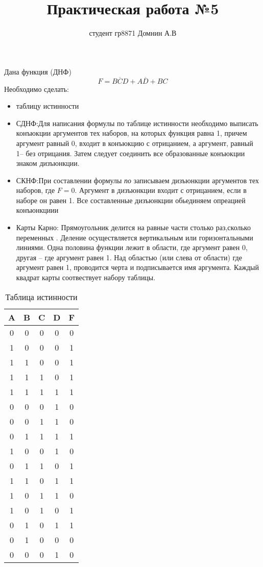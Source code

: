 \documentclass{article}
\title{Практическая работа №5}
\author{студент гр8871 Домнин А.В }
\begin{document}
\maketitle
\newcommand{\D}{10}
\newcommand{\I}{0.6}
\newcommand{\B}{0.2}
Дана функция (ДНФ)
$$
F=B\overline{C}D+A\overline{D}+BC
$$
Необходимо сделать:
\begin{itemize}
    \item таблицу истинности
    \item СДНФ:Для написания формулы по таблице истинности необходимо выписать конъюкции аргументов тех наборов, на которых функция равна 1, причем аргумент равный 0, входит в конъюкцию с отрицанием, а аргумент, равный 1-- без отрицания. Затем следует соединить все образованные конъюкции знаком дизъюнкции.
    \item СКНФ:При составлении формулы {\it по} записываем дизъюнкции аргументов тех наборов, где $F=0$. Аргумент в дизъюнкции входит с отрицанием, если в наборе он равен 1. Все составленные дизъюнкции обьединяем опреацией конъюнкциии
    \item Карты Карно: Прямоугольник делится на равные части столько раз,сколько переменных . Деление осуществляется вертикальным или горизонтальными линиями. Одна половина функции лежит в области, где аргумент равен 0, другая -- где аргумент равен 1. Над областью (или слева от области) где аргумент равен 1, проводится черта и подписывается имя аргумента. Каждый квадрат карты соотвествует набору таблицы.
\end{itemize}



\begin{table}[ht]
\centering
\begin{tabular}{|c|c|c|c|c|} \hline
A & B & C & D & F \\
\hline
0 & 0 & 0 & 0 & 0 \\%
\hline
1 & 0 & 0 & 0 & 1 \\%
\hline
1 & 1 & 0 & 0 & 1 \\%
\hline
1 & 1 & 1 & 0 & 1 \\%
\hline
1 & 1 & 1 & 1 & 1 \\%
\hline
0 & 0 & 0 & 1 & 0 \\%
\hline
0 & 0 & 1 & 1 & 0 \\%
\hline
0 & 1 & 1 & 1 & 1 \\%
\hline
1 & 0 & 0 & 1 & 0 \\%
\hline
0 & 1 & 1 & 0 & 1 \\%
\hline
1 & 1 & 0 & 1 & 1 \\%
\hline
1 & 0 & 1 & 1 & 0 \\%
\hline
1 & 0 & 1 & 0 & 1 \\%
\hline
0 & 1 & 0 & 1 & 1 \\%
\hline
0 & 1 & 0 & 0 & 0 \\%
\hline
0 & 0 & 0 & 1 & 0 \\%
\hline
\end{tabular}
\label{table}
\caption{Таблица истинности}
\end{table}
\end{document}
